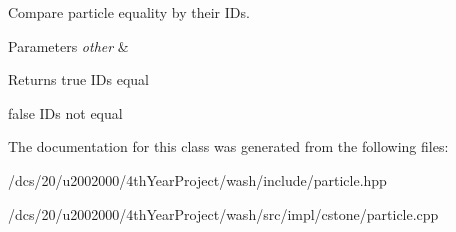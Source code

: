 Compare particle equality by their I\+Ds. 


\begin{DoxyParams}{Parameters}
{\em other} & \\
\hline
\end{DoxyParams}
\begin{DoxyReturn}{Returns}
true ID\textquotesingle{}s equal 

false ID\textquotesingle{}s not equal 
\end{DoxyReturn}


The documentation for this class was generated from the following files\+:\begin{DoxyCompactItemize}
\item 
/dcs/20/u2002000/4th\+Year\+Project/wash/include/particle.\+hpp\item 
/dcs/20/u2002000/4th\+Year\+Project/wash/src/impl/cstone/particle.\+cpp\end{DoxyCompactItemize}
